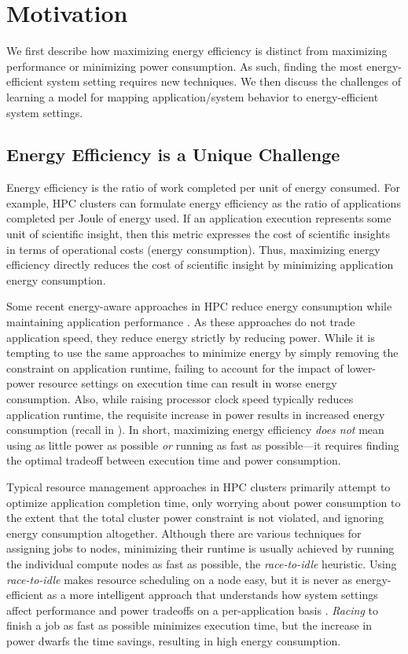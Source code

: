 \section{Motivation}
\label{sec:classifiers-motivation}

We first describe how maximizing energy efficiency is distinct from maximizing performance or minimizing power consumption.
As such, finding the most energy-efficient system setting requires new techniques.
We then discuss the challenges of learning a model for mapping application/system behavior to energy-efficient system settings.


\subsection{Energy Efficiency is a Unique Challenge}

Energy efficiency is the ratio of work completed per unit of energy consumed.
For example, HPC clusters can formulate energy efficiency as the ratio of applications completed per Joule of energy used.
If an application execution represents some unit of scientific insight, then this metric expresses the cost of scientific insights in terms of operational costs (energy consumption).
Thus, maximizing energy efficiency directly reduces the cost of scientific insight by minimizing application energy consumption.

Some recent energy-aware approaches in HPC reduce energy consumption while maintaining application performance \cite{Jitter,Marathe2015,RountreeAdagio}.
As these approaches do not trade application speed, they reduce energy strictly by reducing power.
While it is tempting to use the same approaches to minimize energy by simply removing the constraint on application runtime, failing to account for the impact of lower-power resource settings on execution time can result in worse energy consumption.
Also, while raising processor clock speed typically reduces application runtime, the requisite increase in power results in increased energy consumption (recall  in ).
In short, maximizing energy efficiency \emph{does not} mean using as little power as possible \emph{or} running as fast as possible---it requires finding the optimal tradeoff between execution time and power consumption.


Typical resource management approaches in HPC clusters primarily attempt to optimize application completion time, only worrying about power consumption to the extent that the total cluster power constraint is not violated, and ignoring energy consumption altogether.
Although there are various techniques for assigning jobs to nodes, minimizing their runtime is usually achieved by running the individual compute nodes as fast as possible, \ie the \emph{race-to-idle} heuristic.
Using \emph{race-to-idle} makes resource scheduling on a node easy, but it is never as energy-efficient as a more intelligent approach that understands how system settings affect performance and power tradeoffs on a per-application basis \cite{kim-cpsna2015}.
\emph{Racing} to finish a job as fast as possible minimizes execution time, but the increase in power dwarfs the time savings, resulting in high energy consumption.

